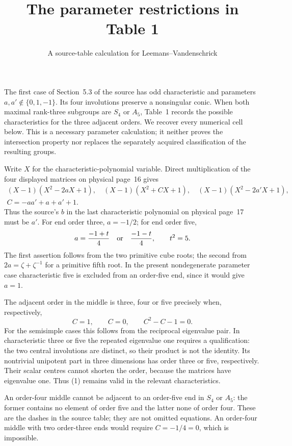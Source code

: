\documentclass[11pt]{article}
\title{The parameter restrictions in Table 1}
\author{A source-table calculation for Leemans--Vandenschrick}\date{}
\begin{document}
\maketitle
The first case of Section~5.3 of the source has odd characteristic and
parameters $a,a'\notin\{0,1,-1\}$. Its four involutions preserve a
nonsingular conic. When both maximal rank-three subgroups are $S_4$ or
$A_5$, Table~1 records the possible characteristics for the three
adjacent orders. We recover every numerical cell below. This is a
necessary parameter calculation; it neither proves the intersection
property nor replaces the separately acquired classification of the
resulting groups.

Write $X$ for the characteristic-polynomial variable. Direct
multiplication of the four displayed matrices on physical page~16 gives
\[
 \begin{gathered}
 (X-1)(X^2-2aX+1),\quad (X-1)(X^2+CX+1),\quad (X-1)(X^2-2a'X+1),\\
 C=-aa'+a+a'+1.
 \end{gathered}
\]
Thus the source's $b$ in the last characteristic polynomial on physical
page~17 must be $a'$. For end order three, $a=-1/2$; for end order five,
\[
 a=\frac{-1+t}{4}\quad\hbox{or}\quad\frac{-1-t}{4},
 \qquad t^2=5.
\]
The first assertion follows from the two primitive cube roots; the second
from $2a=\zeta+\zeta^{-1}$ for a primitive fifth root. In the present
nondegenerate parameter case characteristic five is excluded from an
order-five end, since it would give $a=1$.

The adjacent order in the middle is three, four or five precisely when,
respectively,
\[
 C=1,\qquad C=0,\qquad C^2-C-1=0.                 \tag{1}
\]
For the semisimple cases this follows from the reciprocal eigenvalue
pair. In characteristic three or five the repeated eigenvalue one
requires a qualification: the two central involutions are distinct, so
their product is not the identity. Its nontrivial unipotent part in
three dimensions has order three or five, respectively. Their scalar
centres cannot shorten the order, because the matrices have eigenvalue
one. Thus (1) remains valid in the relevant characteristics.

An order-four middle cannot be adjacent to an order-five end in $S_4$
or $A_5$: the former contains no element of order five and the latter
none of order four. These are the dashes in the source table; they are
not omitted equations. An order-four middle with two order-three ends
would require $C=-1/4=0$, which is impossible.
\end{document}
